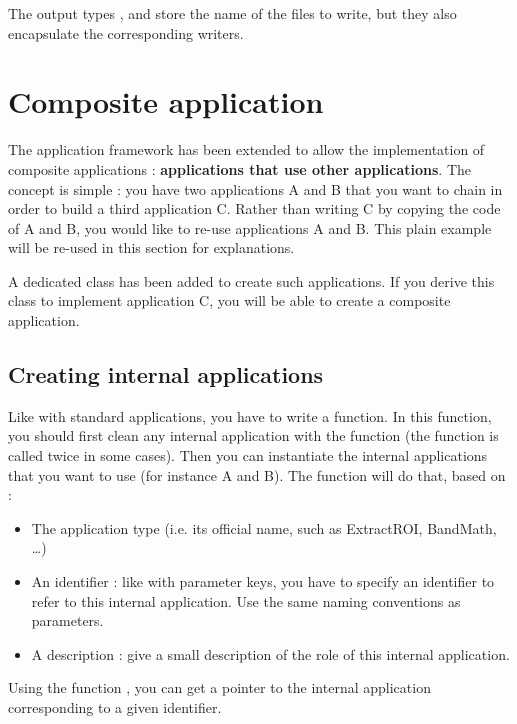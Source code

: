 The output types ,  and  store the 
name of the files to write, but they also encapsulate the corresponding writers.

\section{Composite application}

The application framework has been extended to allow the implementation of composite applications :
\textbf{applications that use other applications}. The concept is simple : you have two applications A and B
that you want to chain in order to build a third application C. Rather than writing C by copying
the code of A and B, you would like to re-use applications A and B. This plain example will be
re-used in this section for explanations.

A dedicated class  has been added to create such applications.
If you derive this class to implement application C, you will be able to create a composite application.

\subsection{Creating internal applications}

Like with standard applications, you have to write a  function. In this function,
you should first clean any internal application with the function 
(the  function is called twice in some cases). Then you can
instantiate the internal applications that you want to use (for instance A and B).
The function  will do that, based on :
\begin{itemize}
\item The application type (i.e. its official name, such as ExtractROI, BandMath, \dots)
\item An identifier : like with parameter keys, you have to specify an identifier
to refer to this internal application. Use the same naming conventions as parameters.
\item A description : give a small description of the role of this internal application.
\end{itemize}

Using the function , you can get a pointer to the
internal application corresponding to a given identifier.

